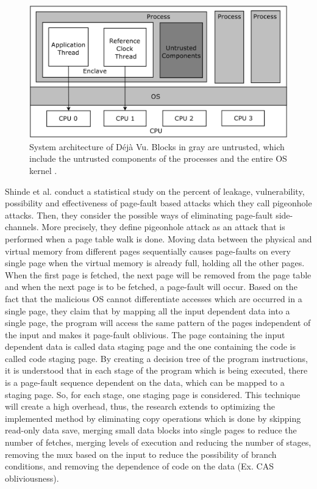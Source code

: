 \begin{figure}
	\includegraphics[scale=0.2]{images/dejavu}
	\caption{System architecture of Déjà Vu. Blocks in gray are untrusted, which include the untrusted components of the processes and the entire OS kernel \cite{dejavu}.}
	\label{fig:dejavu}
\end{figure}

Shinde et al. \cite{pigeonhole} conduct a statistical study on the percent of leakage, vulnerability, possibility and effectiveness of page-fault based attacks which they call pigeonhole attacks. Then, they consider the possible ways of eliminating page-fault side-channels. More precisely, they define pigeonhole attack as an attack that is performed when a page table walk is done. Moving data between the physical and virtual memory from different pages sequentially causes page-faults on every single page when the virtual memory is already full, holding all the other pages. When the first page is fetched, the next page will be removed from the page table and when the next page is to be fetched, a page-fault will occur. Based on the fact that the malicious OS cannot differentiate accesses which are occurred in a single page, they claim that by mapping all the input dependent data into a single page, the program will access the same pattern of the pages independent of the input and makes it page-fault oblivious. The page containing the input dependent data is called data staging page and the one containing the code is called code staging page. By creating a decision tree of the program instructions, it is understood that in each stage of the program which is being executed, there is a page-fault sequence dependent on the data, which can be mapped to a staging page. So, for each stage, one staging page is considered. This technique will create a high overhead, thus, the research extends to optimizing the implemented method by eliminating copy operations which is done by skipping read-only data save, merging small data blocks into single pages to reduce the number of fetches, merging levels of execution and reducing the number of stages, removing the mux based on the input to reduce the possibility of branch conditions, and removing the dependence of code on the data (Ex. CAS obliviousness).

